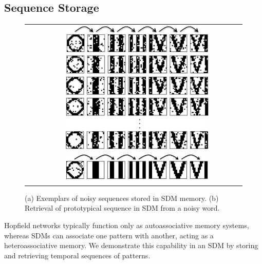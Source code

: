 \documentclass[10pt,letterpaper]{article}
\begin{document}
\subsection{Sequence Storage}

\begin{figure}[b!]
  \begin{center}
    \begin{tabular}{ l c }
      \raisebox{3.5in}{(a)} &
      \includegraphics[width=0.7\textwidth]{./figures/exemplarStoredSequences.png} \vspace{25bp} 
      \\
      \raisebox{.55in}{(b)} &
      \includegraphics[width=0.7\textwidth]{./figures/prototypeRetrievedSequence.png} 
    \end{tabular}
    \caption{(a) Exemplars of noisy sequences stored in SDM
      memory. (b) Retrieval of prototypical sequence in SDM from a
      noisy word.}
    \label{sequences}
  \end{center}
\end{figure}

Hopfield networks typically function only as autoassociative memory systems, whereas SDMs can associate one pattern with another, acting as a heteroassociative memory. We demonstrate this capability in an SDM by storing and retrieving temporal sequences of patterns.
\end{document}
